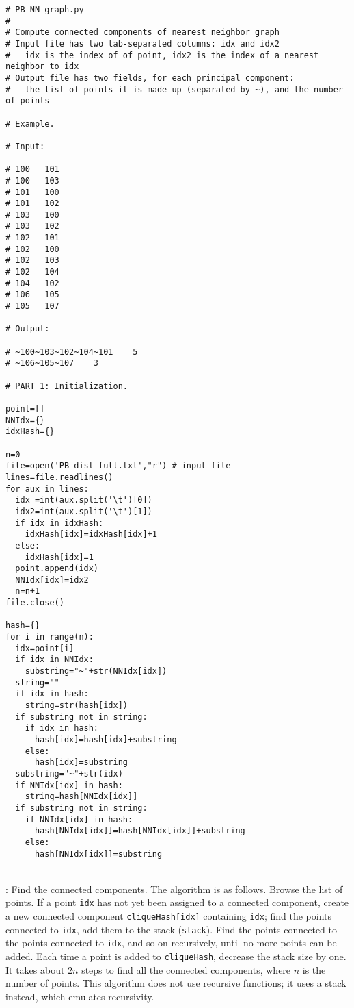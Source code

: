 \documentclass[10pt]{article}
\begin{document}
\begin{lstlisting}
# PB_NN_graph.py
#
# Compute connected components of nearest neighbor graph
# Input file has two tab-separated columns: idx and idx2
#   idx is the index of of point, idx2 is the index of a nearest neighbor to idx
# Output file has two fields, for each principal component:
#   the list of points it is made up (separated by ~), and the number of points

# Example.

# Input:

# 100	101
# 100	103
# 101	100
# 101	102
# 103	100
# 103	102
# 102	101
# 102	100
# 102	103
# 102	104
# 104	102
# 106	105
# 105	107

# Output:

# ~100~103~102~104~101    5
# ~106~105~107    3

# PART 1: Initialization.

point=[]
NNIdx={}
idxHash={}

n=0
file=open('PB_dist_full.txt',"r") # input file
lines=file.readlines()
for aux in lines:
  idx =int(aux.split('\t')[0])
  idx2=int(aux.split('\t')[1])
  if idx in idxHash:
    idxHash[idx]=idxHash[idx]+1
  else:
    idxHash[idx]=1
  point.append(idx)
  NNIdx[idx]=idx2
  n=n+1
file.close()

hash={}
for i in range(n):
  idx=point[i]
  if idx in NNIdx:
    substring="~"+str(NNIdx[idx])
  string=""
  if idx in hash:
    string=str(hash[idx])
  if substring not in string:
    if idx in hash:
      hash[idx]=hash[idx]+substring
    else:
      hash[idx]=substring
  substring="~"+str(idx)
  if NNIdx[idx] in hash:
    string=hash[NNIdx[idx]]
  if substring not in string:
    if NNIdx[idx] in hash:
      hash[NNIdx[idx]]=hash[NNIdx[idx]]+substring
    else:
      hash[NNIdx[idx]]=substring
\end{lstlisting}
\quad \\
: Find the connected components. The algorithm is as follows. Browse the list of points. If a point \texttt{idx} has not yet been assigned to a connected component,
create a new connected component \texttt{cliqueHash[idx]} containing \texttt{idx}; find the points connected to \texttt{idx},
add them to the stack (\texttt{stack}). Find the points connected to the points connected to \texttt{idx}, and so on recursively, until no more points can be added. Each time a point is added to \texttt{cliqueHash}, decrease the stack size by one. It takes
about $2n$ steps to find all the connected components, where $n$ is the number of points. This algorithm does not use recursive functions; it uses a stack instead, which emulates recursivity.
\end{document}
